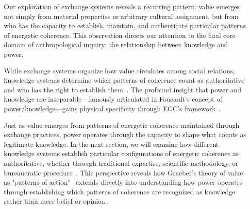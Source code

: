 Our exploration of exchange systems reveals a recurring pattern: value emerges not simply from material properties or arbitrary cultural assignment, but from who has the capacity to establish, maintain, and authenticate particular patterns of energetic coherence. This observation directs our attention to the final core domain of anthropological inquiry: the relationship between knowledge and power.

While exchange systems organize how value circulates among social relations, knowledge systems determine which patterns of coherence count as authoritative and who has the right to establish them~\cite{foucault1980power,wolf1999envisioning}. The profound insight that power and knowledge are inseparable—famously articulated in Foucault's concept of power/knowledge—gains physical specificity through ECC's framework~\cite{foucault1980power,latour1987science}.

Just as value emerges from patterns of energetic coherence maintained through exchange practices, power operates through the capacity to shape what counts as legitimate knowledge. In the next section, we will examine how different knowledge systems establish particular configurations of energetic coherence as authoritative, whether through traditional expertise, scientific methodology, or bureaucratic procedure~\cite{strathern2004partial,nadasdy2003hunters}. This perspective reveals how Graeber's theory of value as "patterns of action"~\cite{graeber2001toward} extends directly into understanding how power operates through establishing which patterns of coherence are recognized as knowledge rather than mere belief or opinion.
